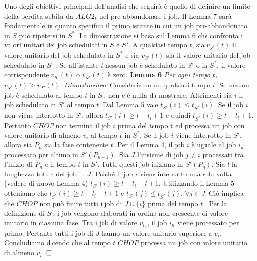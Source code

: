 \documentclass[12pt]{article}
\begin{document}
Uno degli obiettivi principali dell'analisi che seguirà è quello di definire un limite della perdita subita da $ALG2_{k}$ nel pre-abbandonare i job. Il Lemma 7 sarà fondamentale in quanto specifica il primo istante in cui un job pre-abbandonato in $S$ può ripetersi in $S^{*}$. La dimostrazione si basa sul Lemma 6 che confronta i valori unitari dei job schedulati in $S$ e $S'$. A qualsiasi tempo $t$, sia $v_{S^{*}}(t)$ il valore unitario del job schedulato in $S^{*}$ e sia $v_{S'}(t)$ sia il valore unitario del job schedulato in $S'$ . Se all'istante $t$ nessun job è schedulato in $S'$ o in $S^{*}$, il valore corrispondente $v_{S'}(t)$ o $v_{S^{*}}(t)$ è zero.
\newline \newline
\textbf{Lemma 6}
\textit{Per ogni tempo $t$, $v_{S^{*}}(t) \geq v_{S'}(t).$}
\newline \newline
\textit{Dimostrazione}
Consideriamo un qualsiasi tempo $t$. Se nessun job è schedulato al tempo $t$ in $S'$, non c'è nulla da mostrare. Altrimenti sia $i$ il job schedulato in $S'$ al tempo $t$. Dal Lemma 5 vale $t_{S'}(i) \leq t_{S^{*}}(i)$. Se il job $i$ non viene interrotto in $S'$, allora $t_{S'}(i) \geq t - l_{i} + 1$ e quindi $t_{S^{*}}(i) \geq t - l_{i} +1$. Pertanto $CHOP$ non termina il job $i$ prima del tempo t ed processa un job con valore unitario di almeno $v_{i}$ al tempo $t$ in $S^{*}$. Se il job $i$ viene interrotto in $S'$, allora sia $P_{n}$ sia la fase contenente $t$. Per il Lemma 4, il job $i$ è uguale al job $i_{n}$ processato per ultimo in $S'(P_{n - 1})$. Sia $J$ l'insieme di job $j \ne i$ processati tra l'inizio di $P_{n}$ e il tempo $t$ in $S'$. Tutti questi job iniziano in $S'(P_{n})$. Sia $l$ la lunghezza totale dei job in $J$. Poiché il job $i$ viene interrotto una sola volta (vedere di nuovo Lemma 4) $t_{S'}(i) \geq t - l_{i} - l + 1$. Utilizzando il Lemma 5 otteniamo che $t_{S^{*}}(i) \geq t - l_{i} - l + 1$ e $t_{S'}(j) \leq t_{S^{*}}(j)$, $\forall j \in J$. Ciò implica che $CHOP$ non può finire tutti i job di $J \cup \{i\}$ prima del tempo $t$ . Per la definizione di $S'$, i job vengono elaborati in ordine non crescente di valore unitario in ciascuna fase. Tra i job di valore $v_{i_{n}}$, il job $i_{n}$ viene processato per primo. Pertanto tutti i job di $J$ hanno un valore unitario superiore a $v_{i}$. Concludiamo dicendo che al tempo $t$ $CHOP$ processa un job con valore unitario di almeno $v_{i}$. $\hfill \square$
\newline \newline
\end{document}

